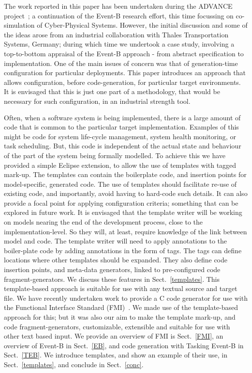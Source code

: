 \documentclass{llncs}%
\begin{document}
The work reported in this paper has been undertaken during the ADVANCE project~\cite{advance}; a continuation of the Event-B research effort, this time focussing on co-simulation of Cyber-Physical Systems. However, the initial discussion and some of the ideas arose from an industrial collaboration with Thales Transportation Systems, Germany; during which time we undertook a case study, involving a top-to-bottom appraisal of the Event-B approach - from abstract specification to implementation. One of the main issues of concern was that of generation-time configuration for particular deployments.  This paper introduces an approach that allows configuration, before code-generation, for particular target environments. It is envisaged that this is just one part of a methodology, that would be necessary for such configuration, in an industrial strength tool.   

Often, when a software system is being implemented, there is a large amount of code that is common to the particular target implementation. Examples of this might be code for system life-cycle management, system health monitoring, or task scheduling. But, this code is independent of the actual state and behaviour of the part of the system being formally modelled. To achieve this we have provided a simple Eclipse extension, to allow the use of templates with tagged mark-up. The templates can contain the boilerplate code, and insertion points for model-specific, generated code. The use of templates should facilitate re-use of existing code, and importantly, avoid having to hard-code such details. It can also provide a focal point for applying configuration criteria; something that can be explored in future work. It is envisaged that the template writer will be working on models nearing the end of the development process, close to the implementation-level. So they will, at least, require knowledge of the link between model and code. The template writer will need to apply annotations to the boiler-plate code by adding annotations in the form of tags. The tags can define locations where other templates should be expanded. They also define code insertion points, and meta-data generators, linked to pre-configured code fragment-generators. We discuss these features in Sect.~\ref{templates}. This template-based approach is suitable for use with any textual source and target file. We have recently undertaken work to provide a C code generator for use with the Functional Interface Standard (FMI)~\cite{bloch2012,bloch2011,FMISTD}. We made use of the template-based approach for this; but it was also our aim to make the template mark-up, and code fragment-generators, customizable, extensible and suitable for use with other text based input. We provide an overview of FMI is Sect.~\ref{FMI}, an overview of Event-B in Sect.~\ref{EB}, and code generation with Tasking Event-B in Sect.~\ref{TEB}. We introduce templates, and show an example of their use, in Sect.~\ref{templates}, and conclude in Sect.~\ref{conc}.
%
%
\end{document}
